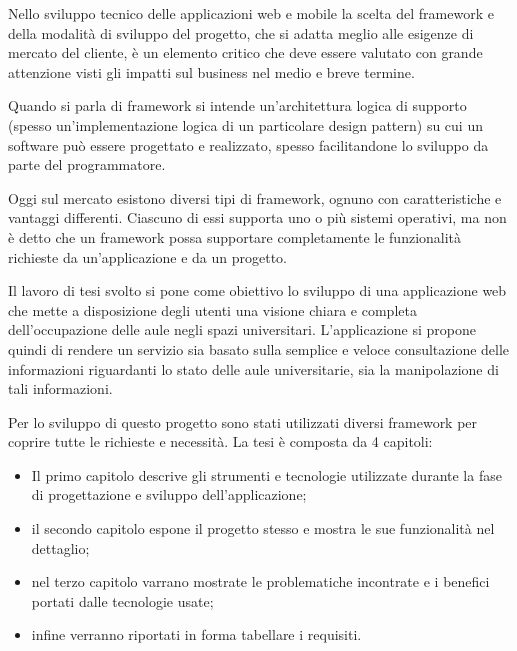 Nello sviluppo tecnico delle applicazioni web e mobile la scelta del framework e della modalità di sviluppo del progetto, che si adatta meglio alle esigenze di mercato del cliente, è un elemento critico che deve essere valutato con grande attenzione visti gli impatti sul business nel medio e breve termine.

Quando si parla di framework si intende un'architettura logica di supporto (spesso un'implementazione logica di un particolare design pattern) su cui un software può essere progettato e realizzato, spesso facilitandone lo sviluppo da parte del programmatore.

Oggi sul mercato esistono diversi tipi di framework, ognuno con caratteristiche e vantaggi differenti. Ciascuno di essi supporta uno o più sistemi operativi, ma non è detto che un framework possa supportare completamente le funzionalità richieste da un’applicazione e da un progetto.

Il lavoro di tesi svolto si pone come obiettivo lo sviluppo di una applicazione web che mette a disposizione degli utenti una visione chiara e completa dell'occupazione delle aule negli spazi universitari. L'applicazione si propone quindi di rendere un servizio sia basato sulla semplice e veloce consultazione delle informazioni riguardanti lo stato delle aule universitarie, sia la manipolazione di tali informazioni.

Per lo sviluppo di questo progetto sono stati utilizzati diversi framework per coprire tutte le richieste e necessità. La tesi è composta da 4 capitoli:
\begin{itemize}
\item Il primo capitolo descrive gli strumenti e tecnologie utilizzate durante la fase di progettazione e sviluppo dell'applicazione;
\item il secondo capitolo espone il progetto stesso e mostra le sue funzionalità nel dettaglio;
\item nel terzo capitolo varrano mostrate le problematiche incontrate e i benefici portati dalle tecnologie usate;
\item infine verranno riportati in forma tabellare i requisiti.
\end{itemize}